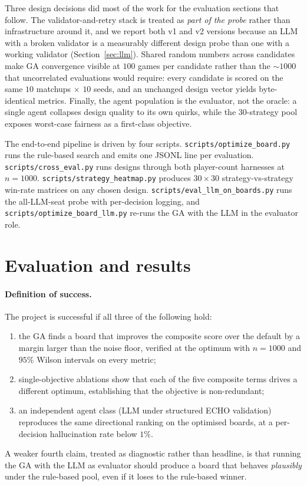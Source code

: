 \documentclass[10pt]{article}
\begin{document}
Three design decisions did most of the work for the evaluation
sections that follow. The validator-and-retry stack is treated as
\emph{part of the probe} rather than infrastructure around it, and we
report both v1 and v2 versions because an LLM with a broken validator
is a measurably different design probe than one with a working
validator (Section~\ref{sec:llm}). Shared random numbers across
candidates make GA convergence visible at $100$ games per candidate
rather than the $\sim 1000$ that uncorrelated evaluations would
require: every candidate is scored on the same $10$ matchups
$\times$ $10$ seeds, and an unchanged design vector yields
byte-identical metrics. Finally, the agent population is the
evaluator, not the oracle: a single agent collapses design quality to
its own quirks, while the 30-strategy pool exposes worst-case
fairness as a first-class objective.

The end-to-end pipeline is driven by four scripts.
\texttt{scripts/optimize\_board.py} runs the rule-based search and
emits one JSONL line per evaluation. \texttt{scripts/cross\_eval.py}
runs designs through both player-count harnesses at $n{=}1000$.
\texttt{scripts/strategy\_heatmap.py} produces $30{\times}30$
strategy-vs-strategy win-rate matrices on any chosen design.
\texttt{scripts/eval\_llm\_on\_boards.py} runs the all-LLM-seat probe
with per-decision logging, and \texttt{scripts/optimize\_board\_llm.py}
re-runs the GA with the LLM in the evaluator role.

\section{Evaluation and results}\label{sec:eval}

\paragraph{Definition of success.} The project is successful if all
three of the following hold:
\begin{enumerate}[leftmargin=1.4em,itemsep=1pt]
\item the GA finds a board that improves the composite score over the
default by a margin larger than the noise floor, verified at the
optimum with $n{=}1000$ and $95\%$ Wilson intervals on every metric;
\item single-objective ablations show that each of the five composite
terms drives a different optimum, establishing that the objective is
non-redundant;
\item an independent agent class (LLM under structured ECHO
validation) reproduces the same directional ranking on the optimised
boards, at a per-decision hallucination rate below $1\%$.
\end{enumerate}
A weaker fourth claim, treated as diagnostic rather than headline, is
that running the GA with the LLM as evaluator should produce a board
that behaves \emph{plausibly} under the rule-based pool, even if it
loses to the rule-based winner.
\end{document}
